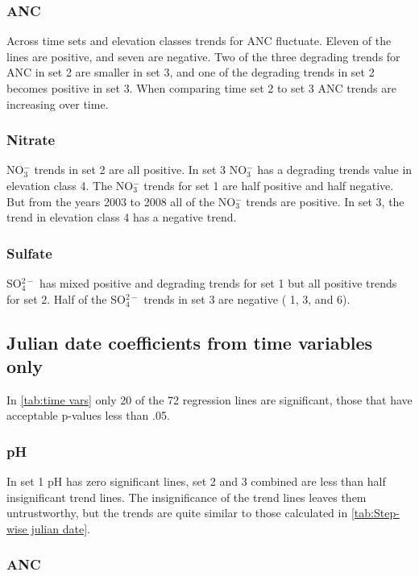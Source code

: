 \subsubsection{ANC}

Across time sets and elevation classes trends for ANC fluctuate.  Eleven of the lines are positive, and seven are negative.   Two of the three degrading trends for ANC in set 2 are smaller in set 3, and one of the degrading trends in set 2 becomes positive in set 3.  When comparing time set 2 to set 3 ANC trends are increasing over time. 

\subsubsection{Nitrate}

NO$_3^-$ trends in set 2 are all positive. In set 3 NO$_3^-$ has a degrading trends value in elevation class 4. The NO$_3^-$ trends for set 1 are half positive and half negative. But from the years 2003 to 2008 all of the NO$_3^-$ trends are positive. In set 3, the trend in elevation class 4 has a negative trend.

\subsubsection{Sulfate}

SO$_4^{2-}$ has mixed positive and degrading trends for set 1 but all positive trends for set 2. Half of the SO$_4^{2-}$ trends in set 3 are negative ( 1, 3, and 6).

\subsection{Julian date coefficients from time variables only}

In \autoref{tab:time vars} only 20 of the 72 regression lines are significant, those that have acceptable p-values less than .05.

\subsubsection{pH}

In set 1 pH has zero significant lines, set 2 and 3 combined are less than half insignificant trend lines. The insignificance of the trend lines leaves them untrustworthy, but the trends are quite similar to those calculated in \autoref{tab:Step-wise julian date}.

\subsubsection{ANC}

